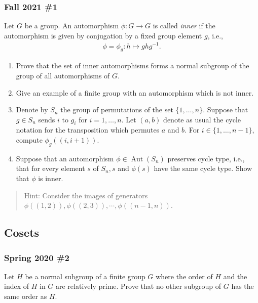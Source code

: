 \hypertarget{fall-2021-1}{%
\subsubsection{Fall 2021 \#1}\label{fall-2021-1}}

Let \(G\) be a group. An automorphism \(\phi: G \rightarrow G\) is
called \emph{inner} if the automorphism is given by conjugation by a
fixed group element \(g\), i.e.,
\begin{align*}
\phi=\phi_{g}: h \mapsto g h g^{-1} .
\end{align*}

\begin{enumerate}
\def\labelenumi{\alph{enumi}.}
\item
  Prove that the set of inner automorphisms forms a normal subgroup of
  the group of all automorphisms of \(G\).
\item
  Give an example of a finite group with an automorphism which is not
  inner.
\item
  Denote by \(S_{n}\) the group of permutations of the set
  \(\{1, \ldots, n\}\). Suppose that \(g \in S_{n}\) sends \(i\) to
  \(g_{i}\) for \(i=1, \ldots, n .\) Let \((a, b)\) denote as usual the
  cycle notation for the transposition which permutes \(a\) and \(b\).
  For \(i \in\{1, \ldots, n-1\}\), compute \(\phi_{g}((i, i+1))\).
\item
  Suppose that an automorphism
  \(\phi \in \operatorname{Aut}\left(S_{n}\right)\) preserves cycle
  type, i.e., that for every element \(s\) of \(S_{n}, s\) and
  \(\phi(s)\) have the same cycle type. Show that \(\phi\) is inner.
\end{enumerate}

\begin{quote}
Hint: Consider the images of generators
\(\phi((1,2)), \phi((2,3)), \cdots, \phi((n-1, n))\).
\end{quote}

\hypertarget{cosets}{%
\subsection{Cosets}\label{cosets}}

\hypertarget{spring-2020-2}{%
\subsubsection{Spring 2020 \#2}\label{spring-2020-2}}

Let \(H\) be a normal subgroup of a finite group \(G\) where the order
of \(H\) and the index of \(H\) in \(G\) are relatively prime. Prove
that no other subgroup of \(G\) has the same order as \(H\).

